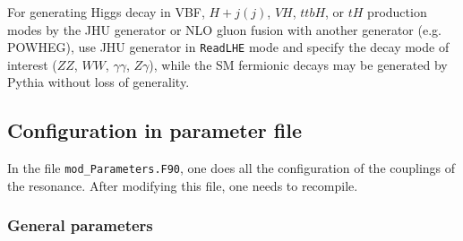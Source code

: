 \documentclass[aps,superscriptaddress,nofootinbib]{revtex4}
\begin{document}

\noindent
For generating Higgs decay in VBF, $H+j(j)$, $VH$, $ttbH$, or $tH$ production
modes by the JHU generator or NLO gluon fusion with another generator (e.g. POWHEG), use JHU generator in \verb|ReadLHE|
mode and specify the decay mode of interest ($ZZ$, $WW$, $\gamma\gamma$, $Z\gamma$), while the SM fermionic decays
may be generated by Pythia without loss of generality.

\subsection{ Configuration in parameter file  }

In the file \verb|mod_Parameters.F90|, one does all the configuration of the couplings of the resonance.
After modifying this file, one needs to recompile.

\subsubsection{ General parameters }
\end{document}
